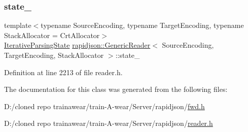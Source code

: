 \subsubsection{\texorpdfstring{state\_}{state\_}}
{\footnotesize\ttfamily template$<$typename Source\+Encoding, typename Target\+Encoding, typename Stack\+Allocator = Crt\+Allocator$>$ \\
\mbox{\hyperlink{classrapidjson_1_1_generic_reader_a1fd8fb2f2f017d42c89a5e11cd074e1e}{Iterative\+Parsing\+State}} \mbox{\hyperlink{classrapidjson_1_1_generic_reader}{rapidjson\+::\+Generic\+Reader}}$<$ Source\+Encoding, Target\+Encoding, Stack\+Allocator $>$\+::state\+\_\+\hspace{0.3cm}{\ttfamily [private]}}



Definition at line 2213 of file reader.\+h.



The documentation for this class was generated from the following files\+:\begin{DoxyCompactItemize}
\item 
D\+:/cloned repo trainawear/train-\/\+A-\/wear/\+Server/rapidjson/\mbox{\hyperlink{fwd_8h}{fwd.\+h}}\item 
D\+:/cloned repo trainawear/train-\/\+A-\/wear/\+Server/rapidjson/\mbox{\hyperlink{reader_8h}{reader.\+h}}\end{DoxyCompactItemize}
